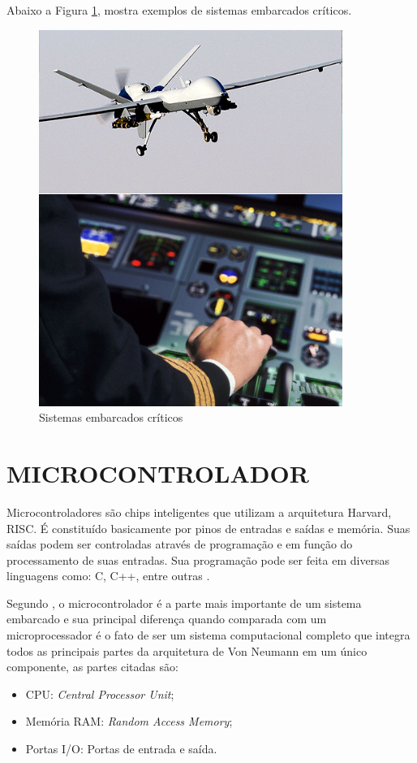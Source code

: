Abaixo a Figura \ref{fig:exSistEmbarcado},  mostra exemplos de sistemas embarcados críticos.

\begin{figure}[htp]
	\centering
	\includegraphics[scale=0.7]{images/exemplo_sistemas_embarcados_criticos.png}	
	\caption{Sistemas embarcados críticos}
	\label{fig:exSistEmbarcado}	
\end{figure}

\section{MICROCONTROLADOR}
Microcontroladores são chips inteligentes que utilizam a arquitetura Harvard, RISC. É constituído basicamente por pinos de entradas e saídas e memória. Suas saídas podem ser controladas através de programação e em função do processamento de suas entradas. Sua programação pode ser feita em diversas linguagens como: C, C++, entre outras \cite{radio2012amadores}.

Segundo \cite{ganssle1999art}, o microcontrolador é a parte mais importante de um sistema embarcado e sua principal diferença quando comparada com um microprocessador é o fato de ser um sistema computacional completo que integra todos as principais partes da arquitetura de Von Neumann em um único componente, as partes citadas são:
\begin{itemize}
\item CPU: \emph{Central Processor Unit};
\item Memória RAM: \emph{Random Access Memory};
\item Portas I/O: Portas de entrada e saída.
\end{itemize}

